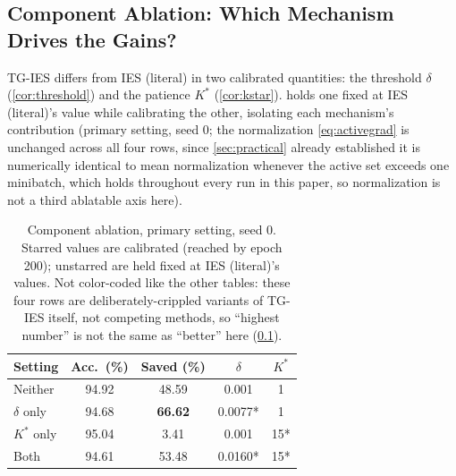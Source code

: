 \documentclass{article}
\theoremstyle{plain}
\theoremstyle{definition}
\theoremstyle{remark}
\begin{document}
\subsection{Component Ablation: Which Mechanism Drives the Gains?}
\label{sec:ablation}

TG-IES differs from IES (literal) in two calibrated quantities: the threshold $\delta$ (\cref{cor:threshold}) and the patience $K^*$ (\cref{cor:kstar}).  holds one fixed at IES (literal)'s value while calibrating the other, isolating each mechanism's contribution (primary setting, seed 0; the normalization \cref{eq:activegrad} is unchanged across all four rows, since \cref{sec:practical} already established it is numerically identical to mean normalization whenever the active set exceeds one minibatch, which holds throughout every run in this paper, so normalization is not a third ablatable axis here).

\begin{table}[h]
\caption{Component ablation, primary setting, seed 0. Starred values are calibrated (reached by epoch 200); unstarred are held fixed at IES (literal)'s values. Not color-coded like the other tables: these four rows are deliberately-crippled variants of TG-IES itself, not competing methods, so ``highest number'' is not the same as ``better'' here (\cref{sec:ablation}).}
\label{tab:ablation}
\vskip 0.1in
\begin{center}
\begin{small}
\begin{tabular}{lcccc}
\toprule
Setting & Acc.\ (\%) & Saved (\%) & $\delta$ & $K^*$ \\
\midrule
Neither & 94.92 & 48.59 & 0.001 & 1 \\
$\delta$ only & 94.68 & \textbf{66.62} & 0.0077* & 1 \\
$K^*$ only & 95.04 & 3.41 & 0.001 & 15* \\
Both & 94.61 & 53.48 & 0.0160* & 15* \\
\bottomrule
\end{tabular}
\end{small}
\end{center}
\vskip -0.1in
\end{table}
\end{document}
